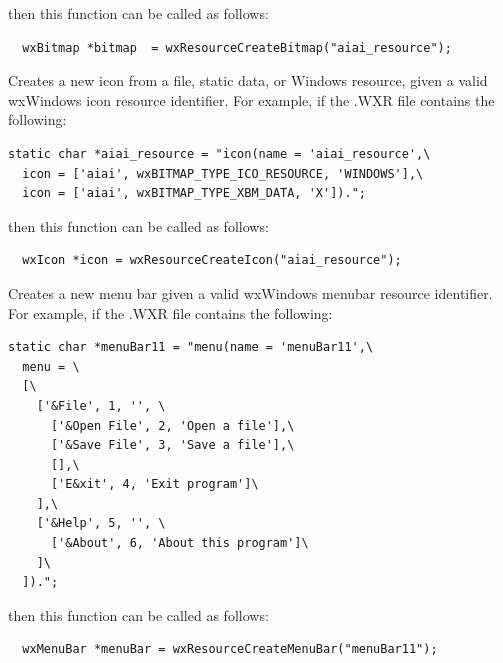 then this function can be called as follows:

\begin{verbatim}
  wxBitmap *bitmap  = wxResourceCreateBitmap("aiai_resource");
\end{verbatim}



Creates a new icon from a file, static data, or Windows resource, given a valid
wxWindows icon resource identifier. For example, if the .WXR file contains
the following:

\begin{verbatim}
static char *aiai_resource = "icon(name = 'aiai_resource',\
  icon = ['aiai', wxBITMAP_TYPE_ICO_RESOURCE, 'WINDOWS'],\
  icon = ['aiai', wxBITMAP_TYPE_XBM_DATA, 'X']).";
\end{verbatim}

then this function can be called as follows:

\begin{verbatim}
  wxIcon *icon = wxResourceCreateIcon("aiai_resource");
\end{verbatim}



Creates a new menu bar given a valid wxWindows menubar resource
identifier. For example, if the .WXR file contains the following:

\begin{verbatim}
static char *menuBar11 = "menu(name = 'menuBar11',\
  menu = \
  [\
    ['&File', 1, '', \
      ['&Open File', 2, 'Open a file'],\
      ['&Save File', 3, 'Save a file'],\
      [],\
      ['E&xit', 4, 'Exit program']\
    ],\
    ['&Help', 5, '', \
      ['&About', 6, 'About this program']\
    ]\
  ]).";
\end{verbatim}

then this function can be called as follows:

\begin{verbatim}
  wxMenuBar *menuBar = wxResourceCreateMenuBar("menuBar11");
\end{verbatim}




